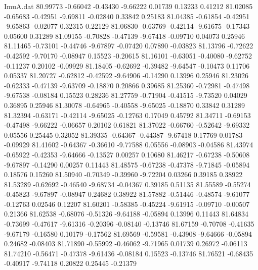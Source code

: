 \begin{filecontents}{ImuA.dat}
  80.99773   -0.66042   -0.43430   -9.66222    0.01739    0.13233    0.41212
  81.02085   -0.65683   -0.42951   -9.69811   -0.02840    0.33842    0.25183
  81.04385   -0.61854   -0.42951   -9.65863   -0.02077    0.32315    0.22129
  81.06830   -0.63769   -0.42114   -9.61675   -0.17343    0.05600    0.31289
  81.09155   -0.70828   -0.47139   -9.67418   -0.09710    0.04073    0.25946
  81.11465   -0.73101   -0.44746   -9.67897   -0.07420    0.07890   -0.03823
  81.13796   -0.72622   -0.42592   -9.70170   -0.08947    0.15523   -0.20615
  81.16101   -0.63051   -0.40080   -9.62752   -0.11237    0.20102   -0.09929
  81.18405   -0.62692   -0.39482   -9.64547   -0.10473    0.11706    0.05337
  81.20727   -0.62812   -0.42592   -9.64906   -0.14290    0.13996    0.25946
  81.23026   -0.62333   -0.47139   -9.63709   -0.18870    0.20866    0.39685
  81.25360   -0.72981   -0.47498   -9.67538   -0.08184    0.15523    0.28236
  81.27759   -0.71904   -0.41515   -9.73520    0.04029    0.36895    0.25946
  81.30078   -0.64965   -0.40558   -9.65025   -0.18870    0.33842    0.31289
  81.32394   -0.63171   -0.42114   -9.65025   -0.12763    0.17049    0.45792
  81.34711   -0.69153   -0.47498   -9.66222   -0.06657    0.20102    0.61821
  81.37022   -0.66760   -0.52642   -9.69332    0.05556    0.25445    0.32052
  81.39335   -0.64367   -0.44387   -9.67418    0.17769    0.01783   -0.09929
  81.41602   -0.64367   -0.36610   -9.77588    0.05556   -0.08903   -0.04586
  81.43974   -0.65922   -0.42353   -9.64666   -0.13527    0.00257    0.10680
  81.46217   -0.67238   -0.50608   -9.67897   -0.14290    0.00257    0.11443
  81.48575   -0.67238   -0.47378   -9.71845   -0.05894    0.18576    0.15260
  81.50940   -0.70349   -0.39960   -9.72204    0.03266    0.39185    0.38922
  81.53289   -0.62692   -0.46540   -9.68734   -0.04367    0.39185    0.51135
  81.55589   -0.55274   -0.45823   -9.67897   -0.08947    0.24682    0.38922
  81.57882   -0.51446   -0.48574   -9.61077   -0.12763    0.02546    0.12207
  81.60201   -0.58385   -0.45224   -9.61915   -0.09710   -0.00507    0.21366
  81.62538   -0.68076   -0.51326   -9.64188   -0.05894    0.13996    0.11443
  81.64834   -0.73699   -0.47617   -9.61316   -0.20396   -0.08140   -0.13746
  81.67159   -0.70708   -0.41635   -9.67179   -0.16580    0.10179   -0.17562
  81.69569   -0.59581   -0.43908   -9.64666   -0.05894    0.24682   -0.08403
  81.71890   -0.55992   -0.46062   -9.71965    0.01739    0.26972   -0.06113
  81.74210   -0.56471   -0.47378   -9.61436   -0.08184    0.15523   -0.13746
  81.76521   -0.68435   -0.40917   -9.74118    0.20822    0.25445   -0.21379

\end{filecontents}

